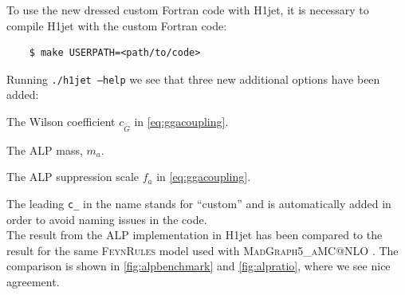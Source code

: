 \documentclass[12pt,a4wide]{article}
\begin{document}
To use the new dressed custom Fortran code with H1jet, it is necessary to compile H1jet with the custom Fortran code: 
\begin{lstlisting}
	$ make USERPATH=<path/to/code> 
\end{lstlisting}
Running \texttt{./h1jet --help} we see that three new additional options have been added: 
\begin{description}[labelindent=\parindent, labelwidth =\widthof{\bfseries9999999999999999999999}, leftmargin = !] 
	\item[\texttt{--c\_CGtil <value>}] The Wilson coefficient $c_{\tilde{G}}$ in \autoref{eq:ggacoupling}. 
	\item[\texttt{--c\_mA <value>}] The ALP mass, $m_a$. 
	\item[\texttt{--c\_fa <value>}] The ALP suppression scale $f_a$ in \autoref{eq:ggacoupling}. 
\end{description}
The leading \texttt{c\_} in the name stands for ``custom'' and is automatically added in order to avoid naming issues in the code. \\ 

The result from the ALP implementation in H1jet has been compared to the result for the same \textsc{FeynRules} model used with \textsc{MadGraph5\_aMC@NLO} \cite{bib:mg5}. The comparison is shown in \autoref{fig:alpbenchmark} and \ref{fig:alpratio}, where we see nice agreement. 
\end{document}

